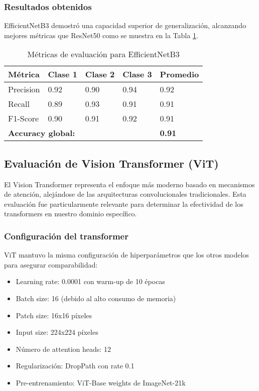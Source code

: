 \subsubsection{Resultados obtenidos}

EfficientNetB3 demostró una capacidad superior de generalización, alcanzando mejores métricas que ResNet50 como se muestra en la Tabla \ref{tab:efficientnet_metrics}.

\begin{table}[H]
\centering
\renewcommand{\arraystretch}{1.3}
\caption{Métricas de evaluación para EfficientNetB3}
\label{tab:efficientnet_metrics}
\begin{tabular}{|p{3cm}|p{2cm}|p{2cm}|p{2cm}|p{2cm}|}
\hline
\textbf{Métrica} & \textbf{Clase 1} & \textbf{Clase 2} & \textbf{Clase 3} & \textbf{Promedio} \\ \hline
Precision & 0.92 & 0.90 & 0.94 & 0.92 \\ \hline
Recall & 0.89 & 0.93 & 0.91 & 0.91 \\ \hline
F1-Score & 0.90 & 0.91 & 0.92 & 0.91 \\ \hline
\multicolumn{4}{|l|}{\textbf{Accuracy global:}} & \textbf{0.91} \\ \hline
\end{tabular}
\end{table}

\subsection{Evaluación de Vision Transformer (ViT)}

El Vision Transformer representa el enfoque más moderno basado en mecanismos de atención, alejándose de las arquitecturas convolucionales tradicionales. Esta evaluación fue particularmente relevante para determinar la efectividad de los transformers en nuestro dominio específico.

\subsubsection{Configuración del transformer}

ViT mantuvo la misma configuración de hiperparámetros que los otros modelos para asegurar comparabilidad:

\begin{itemize}
\item Learning rate: 0.0001 con warm-up de 10 épocas
\item Batch size: 16 (debido al alto consumo de memoria)
\item Patch size: 16x16 píxeles
\item Input size: 224x224 píxeles
\item Número de attention heads: 12
\item Regularización: DropPath con rate 0.1
\item Pre-entrenamiento: ViT-Base weights de ImageNet-21k
\end{itemize}

